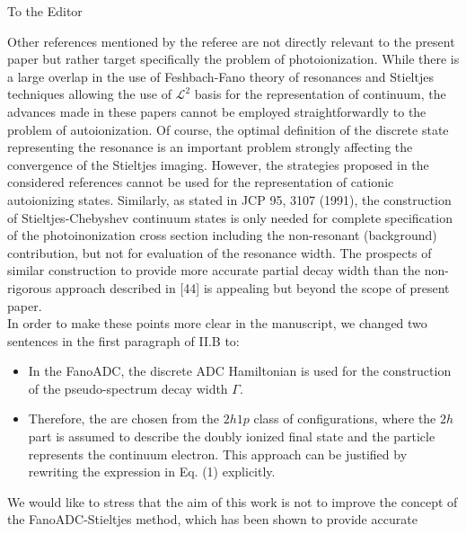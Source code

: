 \documentclass[DIN,pagenumber=false,parskip=half,fromalign=left,fromphone=true,fromemail=true,fromurl=false,fromlogo=false,fromrule=false]{scrlttr2}
\begin{document}
\begin{letter}{To the Editor}
\begin{enumerate}
         Other references mentioned by the referee are not directly relevant to
         the present paper but rather target specifically the problem of
         photoionization. While there is a large overlap in the use of
         Feshbach-Fano theory of resonances and Stieltjes techniques allowing the
         use of $\mathcal{L}^2$ basis for the representation of continuum,
         the advances made
         in these papers cannot be employed straightforwardly to the problem of
         autoionization. Of course, the optimal definition of the discrete state
         representing the resonance is an important problem strongly affecting
         the convergence of the Stieltjes imaging. However, the strategies
         proposed in the considered references cannot be used for the
         representation of cationic autoionizing states.
         Similarly, as stated in JCP 95,
         3107 (1991), the construction of Stieltjes-Chebyshev continuum states
         is only needed for complete specification of the photoinonization cross
         section including the non-resonant (background) contribution,
         but not for evaluation of the resonance width. The prospects of
         similar construction to provide more accurate partial decay width than
         the non-rigorous approach described in [44] is appealing but beyond the
         scope of present paper.\\
         In order to make these points more clear
         in the manuscript, we changed two sentences in the first
         paragraph of II.B to:
     \begin{itemize}
       \item In the FanoADC, the discrete ADC Hamiltonian
             is used for the construction of the pseudo-spectrum
             {\color{blue}{for the evaluation of the total}} decay width $\Gamma$.
       \item Therefore, the {\color{blue}{basis functions for the description of
             the entire final state subspace}} are chosen from
             the $2h1p$ class of configurations, where the $2h$ part is assumed to
             describe the doubly ionized final state and the
             particle represents the continuum electron. This approach can be
             justified by rewriting the expression in Eq. (1) explicitly.
     \end{itemize}
         We would like to stress that the aim of this work is not to improve the
         concept of the
         FanoADC-Stieltjes method, which has been shown to provide accurate

\end{enumerate}
\end{letter}
\end{document}
